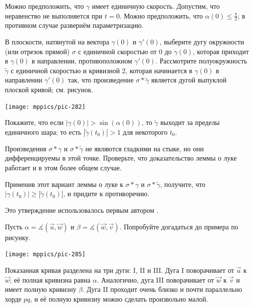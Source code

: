 \begin{multicols}{2}
Можно предположить, что $\gamma$ имеет единичную скорость.
Допустим, что неравенство не выполняется при $t=0$.
Можно предположить, что $\alpha(0)\le\tfrac\pi2$;
в противном случае развернём параметризацию.

В плоскости, натянутой на вектора $\gamma(0)$ и $\gamma'(0)$, выберите дугу окружности (или отрезок прямой) $\sigma$ с единичной скоростью от $0$ до $\gamma(0)$, которая приходит в $\gamma(0)$ в направлении, противоположном $\gamma'(0)$.
Рассмотрите полуокружность $\tilde\gamma$ с единичной скоростью и кривизной $2$, которая начинается в $\gamma(0)$ в направлении $\gamma'(0)$ так, что произведение $\sigma*\tilde\gamma$ является дугой выпуклой плоской кривой; см. рисунок.

\begin{Figure}
\vskip-1mm
\centering
\texttt{[image: mppics/pic-282]}
\vskip-1mm
\end{Figure}

Покажите, что если $|\gamma(0)|> \sin(\alpha(0))$, то $\tilde\gamma$ выходит за пределы единичного шара; то есть $|\tilde\gamma(t_0)|>1$ для некоторого $t_0$.

Произведения $\sigma*\gamma$ и $\sigma*\tilde\gamma$ не являются гладкими на стыке, но они дифференцируемы в этой точке.
Проверьте, что доказательство леммы о луке работает и в этом более общем случае.

Применив этот вариант леммы о луке к $\sigma*\gamma$ и $\sigma*\tilde\gamma$, получите, что $|\gamma(t_0)|\ge |\tilde\gamma(t_0)|$, и придите к противоречию.

 Это утверждение использовалось первым автором \cite{petrunin2023}.



\setcounter{eqtn}{0}

Пусть $\alpha=\measuredangle(\vec u,\vec w)$ 
и $\beta=\measuredangle(\vec w,\vec v)$.
Попробуйте догадаться до примера по рисунку.

\begin{Figure}
\vskip-1mm
\centering
\texttt{[image: mppics/pic-285]}
\vskip-1mm
\end{Figure}

Показанная кривая разделена на три дуги: I, II и III. 
Дуга I поворачивает от $\vec u$ к $\vec w$;
её полная кривизна равна $\alpha$.
Аналогично, дуга III поворачивает от $\vec w$ к $\vec v$ и имеет полную кривизну $\beta$. 
Дуга II проходит очень близко и почти параллельно хорде $pq$, и её полную кривизну можно сделать произвольно малой.


\end{multicols}
